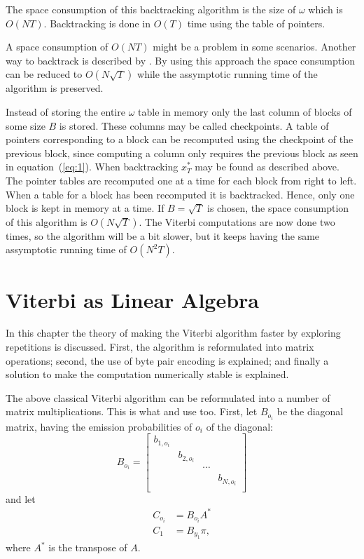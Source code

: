The space consumption of this backtracking algorithm is the size of $\omega$
which is $O(N T)$. Backtracking is done in $O(T)$ time using the table of pointers.

A space consumption of $O(N T)$ might be a problem in some scenarios. Another
way to backtrack is described by \citet{Tarnas01061998}. By using this approach
the space consumption can be reduced to $O\left(N \sqrt{T} \right)$ while the assymptotic
running time of the algorithm is preserved.

Instead of storing the entire $\omega$ table in memory only the last column of
blocks of some size $B$ is stored. These columns may be called checkpoints. A
table of pointers corresponding to a block can be recomputed using the
checkpoint of the previous block, since computing a column only requires the
previous block as seen in equation~(\ref{eq:1}). When backtracking $x_T^*$ may
be found as described above. The pointer tables are recomputed one at a time
for each block from right to left. When a table for a block has been recomputed
it is backtracked. Hence, only one block is kept in memory at a time. If
$B = \sqrt{T}$ is chosen, the space consumption of this algorithm is
$O\left(N \sqrt{T}\right)$. The Viterbi computations are now done two times, so the
algorithm will be a bit slower, but it keeps having the same assymptotic
running time of $O\left(N^2 T\right)$.

\section{Viterbi as Linear Algebra}
\label{sec:algorithm-as-linear}

In this chapter the theory of making the Viterbi algorithm faster by exploring
repetitions is discussed. First, the algorithm is reformulated into matrix
operations; second, the use of byte pair encoding is explained; and finally
a solution to make the computation numerically stable is explained.

The above classical Viterbi algorithm can be reformulated into a number of
matrix multiplications. This is what \citet{sand2013ziphmmlib} and
\citet{lifshits2009speeding} use too. First, let $B_{o_i}$ be the diagonal
matrix, having the emission probabilities of $o_i$ of the diagonal:
\begin{equation*}
  B_{o_i} =
  \begin{bmatrix}
    b_{1, o_i} &            &        &            \\
               & b_{2, o_i} &        &            \\
               &            & \cdots &            \\
               &            &        & b_{N, o_i} \\
  \end{bmatrix}
\end{equation*}
and let
\begin{align*}
  C_{o_i} &= B_{o_i} A^* \\
  C_1 &= B_{y_1} \pi,
\end{align*}
where $A^*$ is the transpose of $A$.

